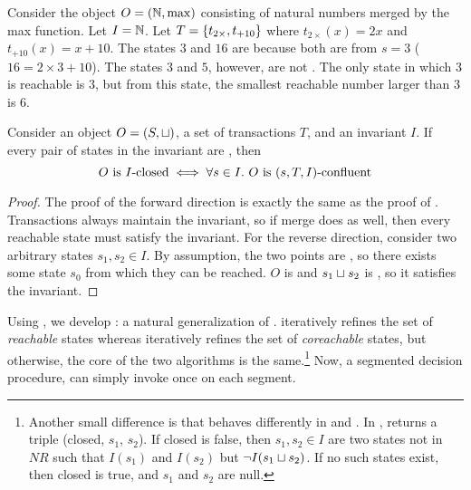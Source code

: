 \begin{example}
  Consider the object $O = (\mathbb{N}, \max)$ consisting of natural numbers merged
  by the max function. Let $I = \mathbb{N}$. Let $T = \{t_{2\times}, t_{+10}\}$
  where $t_{2\times}(x) = 2x$ and $t_{+10}(x) = x + 10$. The states $3$ and
  $16$ are \TIcoreachable{} because both are  from $s =
  3$ ($16 = 2 \times 3 + 10$). The states $3$ and $5$, however, are not
  \TIcoreachable{}. The only state in which $3$ is reachable is $3$, but from
  this state, the smallest reachable number larger than $3$ is $6$.
\end{example}

\begin{theorem}
  Consider an object $O = (S, \sqcup)$, a set of transactions $T$, and an
  invariant $I$. If every pair of states in the invariant are \TIcoreachable{},
  then
  \[
    \hfill
    \text{$O$ is \Iclosed{}}
    \iff
    \forall s \in I.\ \text{$O$ is \sticonfluent{s}{T}{I}}
    \hfill
  \]
\end{theorem}

\begin{proof}
  The proof of the forward direction is exactly the same as the proof of
  . Transactions always maintain the
  invariant, so if merge does as well, then every reachable state must satisfy
  the invariant.
  For the reverse direction, consider two arbitrary states $s_1, s_2 \in I$.
  By assumption, the two points are \TIcoreachable{}, so there exists some
  state $s_0$ from which they can be reached. $O$ is \sTIconfluent{} and $s_1
  \sqcup s_2$ is \sTIreachable{}, so it satisfies the invariant.
\end{proof}

Using , we develop
: a natural generalization
of .
 iteratively refines the set of
\emph{reachable} states whereas
 iteratively refines the
set of \emph{coreachable} states, but otherwise, the core of the two algorithms
is the same.\footnote{%
  Another small difference is that \IsIclosed{} behaves differently in
   and
  . In
  , \IsIclosed{} returns a
  triple (closed, $s_1$, $s_2$). If closed is false, then $s_1, s_2 \in I$
  are two states not in $NR$ such that $I(s_1)$ and $I(s_2)$ but $\lnot I(s_1
  \sqcup s_2)$. If no such states exist, then closed is true, and $s_1$ and
  $s_2$ are null.
}
Now, a segmented \invariantconfluence{} decision procedure, can simply invoke
 once on each segment.

